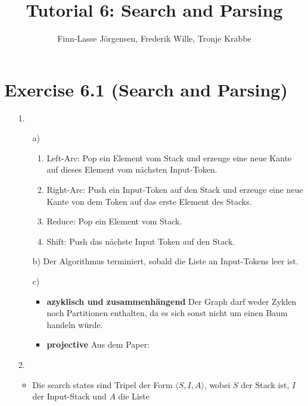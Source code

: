 \documentclass[12pt,a4paper]{article}
\author{Finn-Lasse Jörgensen, Frederik Wille, Tronje Krabbe}
\title{Tutorial 6: Search and Parsing}
\begin{document}
\maketitle


\section*{Exercise 6.1 (Search and Parsing)}
\begin{itemize}
    \item[1.]
        \begin{itemize}
            \item[a)]
                \begin{enumerate}
                    \item Left-Arc: Pop ein Element vom Stack und erzeuge eine
                        neue Kante auf dieses Element vom nächsten Input-Token.
                    \item Right-Arc: Push ein Input-Token auf den Stack und
                        erzeuge eine neue Kante von dem Token auf das erste
                        Element des Stacks.
                    \item Reduce: Pop ein Element vom Stack.
                    \item Shift: Push das nächste Input Token auf den Stack.
                \end{enumerate}
            \item[b)]
                Der Algorithmus terminiert, sobald die Liste an Input-Tokens leer ist.
            \item[c)]
                \begin{itemize}
                    \item \textbf{azyklisch und zusammenhängend}
                        Der Graph darf weder Zyklen noch Partitionen enthalten,
                        da es sich sonst nicht um einen Baum handeln würde.
                    \item \textbf{projective}
                        Aus dem Paper: 
                \end{itemize}
        \end{itemize}
    \item[2.]
        \begin{itemize}
            \item Die search states sind Tripel der Form $ \langle S, I, A \rangle $,
                wobei $S$ der Stack ist, $I$ der Input-Stack und $A$ die Liste

\end{itemize}
\end{itemize}
\end{document}
